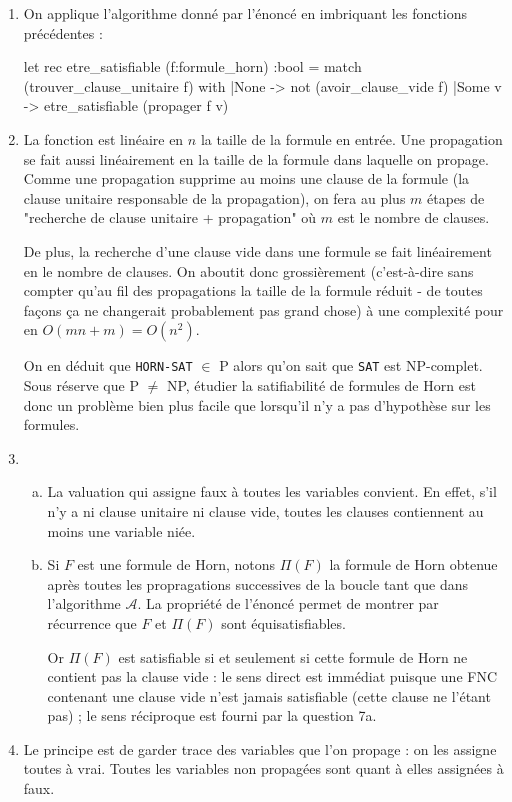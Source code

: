 \documentclass{ccinp}
\begin{document}
\begin{enumerate}
  \item On applique l'algorithme donné par l'énoncé en imbriquant les fonctions précédentes : \begin{ocode}
let rec etre_satisfiable (f:formule_horn) :bool =
  match (trouver_clause_unitaire f) with
  |None -> not (avoir_clause_vide f)
  |Some v -> etre_satisfiable (propager f v)
\end{ocode}
    
  \item La fonction  est linéaire en $n$ la taille de la formule en entrée. Une propagation se fait aussi linéairement en la taille de la formule dans laquelle on propage. Comme une propagation supprime au moins une clause de la formule (la clause unitaire responsable de la propagation), on fera au plus $m$ étapes de "recherche de clause unitaire + propagation" où $m$ est le nombre de clauses.
  
  De plus, la recherche d'une clause vide dans une formule se fait linéairement en le nombre de clauses. On aboutit donc grossièrement (c'est-à-dire sans compter qu'au fil des propagations la taille de la formule réduit - de toutes façons ça ne changerait probablement pas grand chose) à une complexité pour  en $O(mn + m) = O(n^2)$.
  
  On en déduit que \texttt{HORN-SAT} $\in$ P alors qu'on sait que \texttt{SAT} est NP-complet. Sous réserve que P $\neq$ NP, étudier la satifiabilité de formules de Horn est donc un problème bien plus facile que lorsqu'il n'y a pas d'hypothèse sur les formules.
  
  \item \begin{enumerate}[a)]
      \item La valuation qui assigne faux à toutes les variables convient. En effet, s'il n'y a ni clause unitaire ni clause vide, toutes les clauses contiennent au moins une variable niée.
      \item Si $F$ est une formule de Horn, notons $\Pi(F)$ la formule de Horn obtenue après toutes les propragations successives de la boucle tant que dans l'algorithme $\mathcal{A}$. La propriété de l'énoncé permet de montrer par récurrence que $F$ et $\Pi(F)$ sont équisatisfiables.
      
      Or $\Pi(F)$ est satisfiable si et seulement si cette formule de Horn ne contient pas la clause vide : le sens direct est immédiat puisque une FNC contenant une clause vide n'est jamais satisfiable (cette clause ne l'étant pas) ; le sens réciproque est fourni par la question 7a.      

  \end{enumerate}
      \item Le principe est de garder trace des variables que l'on propage : on les assigne toutes à vrai. Toutes les variables non propagées sont quant à elles assignées à faux.
  
  
  \end{enumerate}
\end{document}
